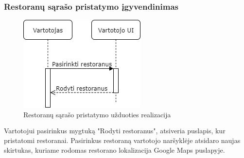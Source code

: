 \documentclass{VUMIFInfKursinis}
\begin{document}
\subsubsection{Restoranų sąrašo pristatymo įgyvendinimas}

\begin{figure}[H]
    \centering
 \includegraphics[scale=0.6]{img/seqRest}
    \caption{Restoranų sąrašo pristatymo užduoties realizacija}   %
    \label{img:mlp}
\end{figure}
\bigskip
Vartotojui pasirinkus mygtuką "Rodyti restoranus", atsiveria puslapis, kur pristatomi restoranai. Pasirinkus restoraną vartotojo naršyklėje atsidaro naujas skirtukas, kuriame rodomas restorano lokalizacija Google Maps puslapyje.

\end{document}
